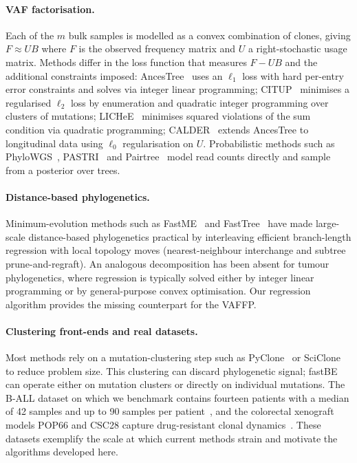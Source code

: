 \paragraph{VAF factorisation.}
Each of the $m$ bulk samples is modelled as a convex combination of clones, giving $F \approx UB$ where $F$ is the observed frequency matrix and $U$ a right-stochastic usage matrix. Methods differ in the loss function that measures $F-UB$ and the additional constraints imposed: AncesTree~\cite{elkebir2015reconstruction} uses an $\ell_1$ loss with hard per-entry error constraints and solves via integer linear programming; CITUP~\cite{malikic2015citup} minimises a regularised $\ell_2$ loss by enumeration and quadratic integer programming over clusters of mutations; LICHeE~\cite{popic2015lichee} minimises squared violations of the sum condition via quadratic programming; CALDER~\cite{myers2019calder} extends AncesTree to longitudinal data using $\ell_0$ regularisation on $U$. Probabilistic methods such as PhyloWGS~\cite{deshwar2015phylowgs}, PASTRI~\cite{satas2017pastri} and Pairtree~\cite{wintersinger2022pairtree} model read counts directly and sample from a posterior over trees.

\paragraph{Distance-based phylogenetics.}
Minimum-evolution methods such as FastME~\cite{desper2002fastme,lefort2015fastme} and FastTree~\cite{price2010fasttree} have made large-scale distance-based phylogenetics practical by interleaving efficient branch-length regression with local topology moves (nearest-neighbour interchange and subtree prune-and-regraft). An analogous decomposition has been absent for tumour phylogenetics, where regression is typically solved either by integer linear programming or by general-purpose convex optimisation. Our regression algorithm provides the missing counterpart for the VAFFP.

\paragraph{Clustering front-ends and real datasets.}
Most methods rely on a mutation-clustering step such as PyClone~\cite{roth2014pyclone} or SciClone~\cite{miller2014sciclone} to reduce problem size. This clustering can discard phylogenetic signal; fastBE can operate either on mutation clusters or directly on individual mutations. The B-ALL dataset on which we benchmark contains fourteen patients with a median of 42 samples and up to 90 samples per patient~\cite{wintersinger2022pairtree}, and the colorectal xenograft models POP66 and CSC28 capture drug-resistant clonal dynamics~\cite{rehman2021diapause}. These datasets exemplify the scale at which current methods strain and motivate the algorithms developed here.
